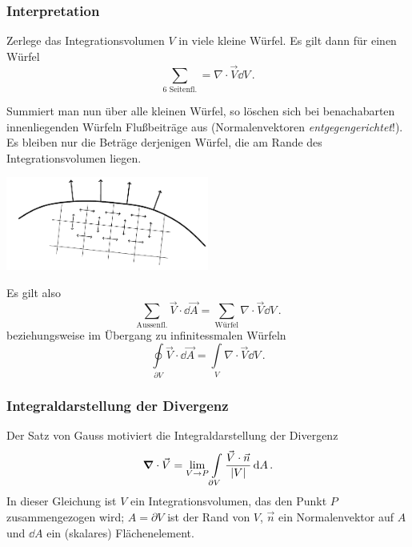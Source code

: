 \documentclass[paper=a4, fontsize=11.0pt, abstractoff, DIV12]{scrartcl}
\begin{document}
\subsubsection{Interpretation}

Zerlege das Integrationsvolumen $V$ in viele kleine Würfel. Es gilt dann für
einen Würfel
\begin{equation}
\sum\limits_{\text{6 Seitenfl.}} = \nabla\cdot\vec V \dd V\, .
\end{equation}

Summiert man nun über alle kleinen Würfel, so löschen sich bei benachabarten
innenliegenden Würfeln Flußbeiträge aus (Normalenvektoren \emph
{entgegengerichtet}!). Es bleiben nur die Beträge derjenigen Würfel, die am
Rande des Integrationsvolumen liegen.

\begin{center}
    \includegraphics[width=0.5\textwidth]{Figures/Gauss}
\end{center}

Es gilt also
\begin{equation*}
\sum\limits_{\text{Aussenfl.}} \vec V \cdot \dd \vec A = \sum\limits_{\text{Würfel}}\nabla\cdot\vec V \dd V\, .
\end{equation*}
beziehungsweise im Übergang zu infinitessmalen Würfeln
\begin{equation}
\oint\limits_{\partial V} \vec V \cdot \dd \vec A = \int\limits_{V} \nabla \cdot \vec V \dd V\, .
\end{equation}


\subsubsection{Integraldarstellung der Divergenz}

Der Satz von Gauss motiviert die Integraldarstellung der Divergenz
\begin{equation}
\nabla\cdot \vec V = \lim\limits_{V\to P}\int\limits_{\partial V}\frac{\vec V \cdot \vec n}{\abs{V}}\,\dd A\,.
\end{equation}
In dieser Gleichung ist $V$ ein Integrationsvolumen, das den Punkt $P$
zusammengezogen wird; $A = \partial V$ ist der Rand von $V$, $\vec n$ ein
Normalenvektor auf $A$ und $\dd A$ ein (skalares) Flächenelement.
\end{document}
